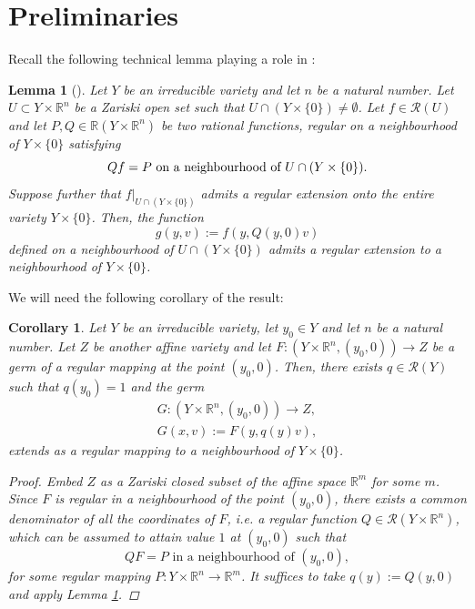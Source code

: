 \documentclass{article}
\theoremstyle{plain}
\newtheorem{lem}[thm]{Lemma}
\newtheorem{cor}[thm]{Corollary}
\theoremstyle{definition}
\theoremstyle{remark}
\newcommand{\R}{\mathbb{R}}
\newcommand{\RR}{\mathcal{R}}
\begin{document}
\section{Preliminaries}

Recall the following technical lemma playing a role in \cite{baneckiRelativeStoneWeierstrassTheorem2024}:
\begin{lem}[{\cite[Lemma 3.2]{baneckiRelativeStoneWeierstrassTheorem2024}}]\label{gluing_lem}
Let $Y$ be an irreducible variety and let $n$ be a natural number. Let $U\subset Y\times\R^n$ be a Zariski open set such that $U\cap (Y\times\{0\})\neq\emptyset$. Let $f\in\RR(U)$ and let $P,Q\in\R(Y\times\R^n)$ be two rational functions, regular on a neighbourhood of $Y\times\{0\}$ satisfying
\begin{equation*}
    Qf=P\textnormal{ on a neighbourhood of } U\cap (Y\times\{0\}).
\end{equation*}
Suppose further that $f\vert_{U\cap (Y\times\{0\})}$ admits a regular extension onto the entire variety $Y\times\{0\}$. Then, the function
\begin{equation*}
    g(y,v):=f(y,Q(y,0)v)
\end{equation*}
defined on a neighbourhood of $U\cap (Y\times\{0\})$ admits a regular extension to a neighbourhood of $Y\times\{0\}$.
\end{lem}

We will need the following corollary of the result:

\begin{cor}\label{gluing_cor}
Let $Y$ be an irreducible variety, let $y_0\in Y$ and let $n$ be a natural number. Let $Z$ be another affine variety and let $F:(Y\times \R^n,(y_0,0))\rightarrow Z$ be a germ of a regular mapping at the point $(y_0,0)$. Then, there exists $q\in \RR(Y)$ such that $q(y_0)=1$ and the germ
\begin{gather*}
    G:(Y\times \R^n,(y_0,0))\rightarrow Z,\\
    G(x,v):= F(y,q(y)v),
\end{gather*}
extends as a regular mapping to a neighbourhood of $Y\times \{0\}$.
\begin{proof}
Embed $Z$ as a Zariski closed subset of the affine space $\R^m$ for some $m$. Since $F$ is regular in a neighbourhood of the point $(y_0,0)$, there exists a common denominator of all the coordinates of $F$, i.e. a regular function $Q\in \RR(Y\times \R^n)$, which can be assumed to attain value $1$ at $(y_0,0)$ such that 
\begin{equation*}
    QF=P\text{ in a neighbourhood of }(y_0,0),
\end{equation*}
for some regular mapping $P:Y\times\R^n\rightarrow \R^m$. It suffices to take $q(y):=Q(y,0)$ and apply Lemma \ref{gluing_lem}.
\end{proof}
\end{cor}
\end{document}
